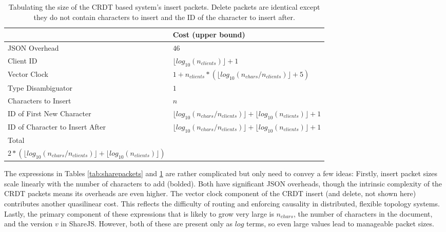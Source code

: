 \documentclass[12pt,a4paper,twoside,openright]{report}
\begin{document}
			\begin{table}[htb]
			\centering
			\caption[CRDT System Insert Packet Size]{Tabulating the size of the CRDT based system's insert packets. Delete packets are identical except they do not contain characters to insert and the ID of the character to insert after.}
			\label{tab:crdtinsertpacket}
			\setlength{\tabcolsep}{12pt}
			\begin{tabular}{@{}ll@{}}
			
                             & Cost (upper bound)\\ \toprule                                                                                                                                                       
			JSON Overhead                   & $46$ \\ \midrule
			Client ID                       & $\lfloor log_{10}(n_{clients}) \rfloor+1$  \\ \midrule
			Vector Clock                    & $1 + n_{clients} * (\lfloor log_{10}(n_{chars}/n_{clients})\rfloor + 5)$ \\ \midrule
			Type Disambiguator              & $1$ \\ \midrule
			Characters to Insert            & $n$ \\ \midrule
			ID of First New Character       & $\lfloor log_{10}(n_{chars}/n_{clients}) \rfloor + \lfloor log_{10}(n_{clients}) \rfloor  +1$  \\ \midrule
			ID of Character to Insert After & $\lfloor log_{10}(n_{chars}/n_{clients}) \rfloor + \lfloor log_{10}(n_{clients}) \rfloor +1$  \\ \bottomrule
			Total                           & \makecell{$51 + \boldsymbol{n} + \boldsymbol{5n_{clients}} + \boldsymbol{n_{clients} *(\lfloor log_{10}(n_{chars}/n_{clients}\rfloor)} +$ \\ $2*(\lfloor log_{10}(n_{chars}/n_{clients}) \rfloor + \lfloor log_{10}(n_{clients}) \rfloor)$}
			\end{tabular}
			\end{table}
			
			The expressions in Tables \ref{tab:sharepackets} and \ref{tab:crdtinsertpacket} are rather complicated but only need to convey a few ideas: Firstly, insert packet sizes scale linearly with the number of characters to add (bolded). Both have significant JSON overheads, though the intrinsic complexity of the CRDT packets means its overheads are even higher. The vector clock component of the CRDT insert (and delete, not shown here) contributes another quasilinear cost. This reflects the difficulty of routing and enforcing causality in distributed, flexible topology systems. Lastly, the primary component of these expressions that is likely to grow very large is $n_{chars}$, the number of characters in the document, and the version $v$ in ShareJS. However, both of these are present only as $log$ terms, so even large values lead to manageable packet sizes.
			
\end{document}
